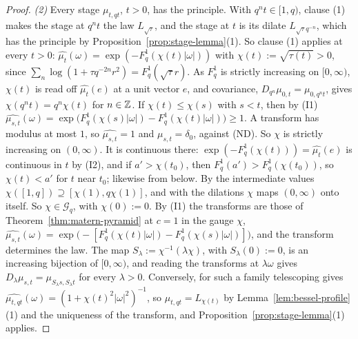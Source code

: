\begin{proof}
\emph{(2)} Every stage $\mu_{t,qt}$, $t > 0$, has the principle. With $q^nt \in [1, q)$, clause (1)
makes the stage at $q^nt$ the law $L_{\sqrt\tau}$, and the stage at $t$ is its dilate
$L_{\sqrt\tau q^{-n}}$, which has the principle by Proposition~\ref{prop:stage-lemma}(1). So clause
(1) applies at every $t > 0$: $\widehat{\mu_t}(\omega) = \exp(-F^1_q(\chi(t)|\omega|))$ with
$\chi(t) := \sqrt{\tau(t)} > 0$, since $\sum_n\log(1 + \tau q^{-2n}r^2) = F^1_q(\sqrt\tau r)$. As
$F^1_q$ is strictly increasing on $[0, \infty)$, $\chi(t)$ is read off $\widehat{\mu_t}(e)$ at a
unit vector $e$, and covariance, $D_{q^n}\mu_{0,t} = \mu_{0,q^nt}$, gives
$\chi(q^nt) = q^n\chi(t)$ for $n \in \mathbb{Z}$. If $\chi(t) \le \chi(s)$ with $s < t$, then by (I1)
$\widehat{\mu_{s,t}}(\omega) = \exp\bigl(F^1_q(\chi(s)|\omega|) - F^1_q(\chi(t)|\omega|)\bigr) \ge 1$.
A transform has modulus at most $1$, so $\widehat{\mu_{s,t}} = 1$ and $\mu_{s,t} = \delta_0$,
against (ND). So $\chi$ is strictly increasing on $(0, \infty)$. It is continuous there:
$\exp(-F^1_q(\chi(t))) = \widehat{\mu_t}(e)$ is continuous in $t$ by (I2), and if
$a' > \chi(t_0)$, then $F^1_q(a') > F^1_q(\chi(t_0))$, so $\chi(t) < a'$ for $t$ near $t_0$;
likewise from below. By the intermediate values $\chi([1, q]) \supseteq [\chi(1), q\chi(1)]$, and
with the dilations $\chi$ maps $(0, \infty)$ onto itself. So $\chi \in \mathcal{G}_q$, with
$\chi(0) := 0$. By (I1) the transforms are those of Theorem~\ref{thm:matern-pyramid} at $c = 1$ in
the gauge $\chi$,
$\widehat{\mu_{s,t}}(\omega) = \exp\bigl(-[F^1_q(\chi(t)|\omega|) - F^1_q(\chi(s)|\omega|)]\bigr)$,
and the transform determines the law. The map $S_\lambda := \chi^{-1}(\lambda\chi)$, with
$S_\lambda(0) := 0$, is an increasing bijection of $[0, \infty)$, and reading the transforms at
$\lambda\omega$ gives $D_\lambda\mu_{s,t} = \mu_{S_\lambda s, S_\lambda t}$ for every
$\lambda > 0$. Conversely, for such a family telescoping gives
$\widehat{\mu_{t,qt}}(\omega) = (1 + \chi(t)^2|\omega|^2)^{-1}$, so $\mu_{t,qt} = L_{\chi(t)}$ by
Lemma~\ref{lem:bessel-profile}(1) and the uniqueness of the transform, and
Proposition~\ref{prop:stage-lemma}(1) applies.


\end{proof}

